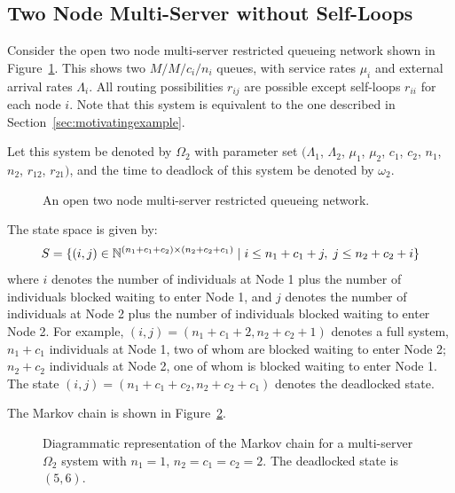 \documentclass{article}
\numberwithin{equation}{section}
\begin{document}
\subsection{Two Node Multi-Server without Self-Loops}\label{sec:2nodeMS}

Consider the open two node multi-server restricted queueing network shown in
Figure~\ref{fig:queueingnetwork_2nodemulti}.
This shows two \(M/M/c_i/n_i\) queues, with service rates $\mu_i$ and external
arrival rates $\Lambda_i$.
All routing possibilities $r_{ij}$ are possible except self-loops $r_{ii}$ for
each node $i$.
Note that this system is equivalent to the one described in
Section~\ref{sec:motivatingexample}.

Let this system be denoted by $\Omega_2$ with parameter set $(\Lambda_1$,
$\Lambda_2$, $\mu_1$, $\mu_2$, $c_1$, $c_2$, $n_1$, $n_2$, $r_{12}$, $r_{21})$,
and the time to deadlock of this system be denoted by $\omega_2$.

\begin{figure}[!htbp]
  \begin{center}
  
  \end{center}
  \caption{An open two node multi-server restricted queueing network.}
  \label{fig:queueingnetwork_2nodemulti}
\end{figure}

The state space is given by:
        \[S = \{(i,j)\in\mathbb{N}^{(n_1+c_1+c_2)\times (n_2+c_2+c_1)} \nonscript\; | \nonscript\; i \leq n_1+c_1+j, \nonscript\; j \leq n_2+c_2+i\}\]
where $i$ denotes the number of individuals at Node 1 plus the number of
individuals blocked waiting to enter Node 1, and $j$ denotes the number of
individuals at Node 2 plus the number of individuals blocked waiting to enter
Node 2.
For example, $(i, j) = (n_1+c_1+2, n_2+c_2+1)$ denotes a full system,
$n_1+c_1$ individuals at Node 1, two of whom are blocked waiting to enter
Node 2; $n_2+c_2$ individuals at Node 2, one of whom is blocked waiting to
enter Node 1.
The state $(i, j) = (n_1+c_1+c_2, n_2+c_2+c_1)$ denotes the deadlocked state.

The Markov chain is shown in Figure~\ref{fig:2nodeMCms}.

\begin{figure}[!htbp]
    
    \caption{Diagrammatic representation of the Markov chain for a
    multi-server $\Omega_2$ system with $n_1=1$, $n_2=c_1=c_2=2$.
    The deadlocked state is $(5,6)$.}
    \label{fig:2nodeMCms}
\end{figure}
\end{document}
